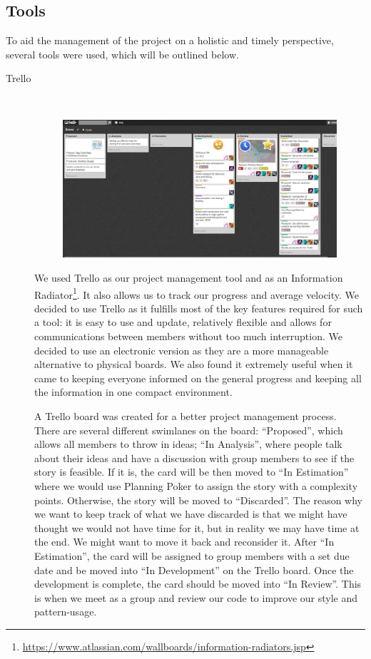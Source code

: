 \documentclass[11pt, a4paper]{article}
\begin{document}
\subsection{Tools}
To aid the management of the project on a holistic and timely perspective, several tools were used, which will be outlined below.

\begin{description}

\item[Trello] \hfill \\
\begin{figure}[h!]
\centering
\includegraphics[width=\textwidth]{Trello.png}
\end{figure}

We used Trello as our project management tool and as an Information Radiator\footnote{\url{https://www.atlassian.com/wallboards/information-radiators.jsp}}.
It also allows us to track our progress and average velocity. 
We decided to use Trello as it fulfills most of the key features required for such a tool: it is easy to use and update, relatively flexible and allows for communications between members without too much interruption. 
We decided to use an electronic version as they are a more manageable alternative to physical boards. 
We also found it extremely useful when it came to keeping everyone informed on the general progress and keeping all the information in one compact environment.

A Trello board was created for a better project management process. 
There are several different swimlanes on the board: ``Proposed'', which allows all members to throw in ideas; ``In Analysis'', where people talk about their ideas and have a discussion with group members to see if the story is feasible. 
If it is, the card will be then moved to ``In Estimation'' where we would use Planning Poker to assign the story with a complexity points.
Otherwise, the story will be moved to ``Discarded''.
The reason why we want to keep track of what we have discarded is that we might have thought we would not have time for it, but in reality we may have time at the end.
We might want to move it back and reconsider it. 
After ``In Estimation'', the card will be assigned to group members with a set due date and be moved into ``In Development'' on the Trello board. 
Once the development is complete, the card should be moved into ``In Review''. 
This is when we meet as a group and review our code to improve our style and pattern-usage.


\end{description}
\end{document}
